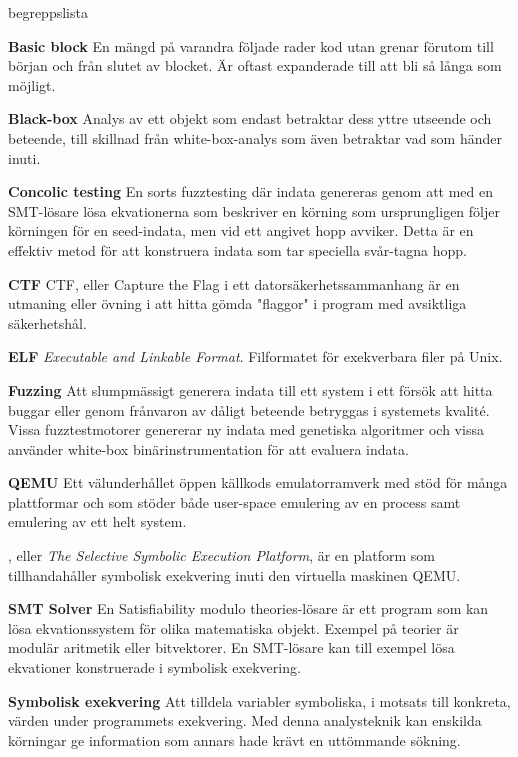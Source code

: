 \begin{labeling}{begreppslista}

  \item[\textbf{Basic block}] En mängd på varandra följade rader kod
      utan grenar förutom till början och från slutet av blocket. Är
      oftast expanderade till att bli så långa som möjligt.

  \item [\textbf{Black-box}] Analys av ett objekt som endast betraktar dess
      yttre utseende och beteende, till skillnad från white-box-analys som även
      betraktar vad som händer inuti.

  \item [\textbf{Concolic testing}] En sorts fuzztesting där indata genereras
      genom att med en SMT-lösare lösa ekvationerna som beskriver en körning som
      ursprungligen följer körningen för en seed-indata, men vid ett angivet
      hopp avviker. Detta är en effektiv metod för att konstruera indata som tar
      speciella svår-tagna hopp.

  \item [\textbf{CTF}] CTF, eller Capture the Flag i ett
    datorsäkerhetssammanhang är en utmaning eller övning i
    att hitta gömda "flaggor" i program med avsiktliga säkerhetshål.

  \item [\textbf{ELF}] \emph{Executable and Linkable Format}. Filformatet för
      exekverbara filer på Unix.

  \item [\textbf{Fuzzing}] Att slumpmässigt generera indata till ett system i
      ett försök att hitta buggar eller genom frånvaron av dåligt beteende
      betryggas i systemets kvalité. Vissa fuzztestmotorer genererar ny indata
      med genetiska algoritmer och vissa använder white-box binärinstrumentation
      för att evaluera indata.

  \item [\textbf{QEMU}] Ett välunderhållet öppen källkods emulatorramverk med stöd
    för många plattformar och som stöder både user-space emulering av en process
    samt emulering av ett helt system.

  \item [\textbf{\stoe}] \stoe, eller \emph{The Selective Symbolic Execution Platform}, är
      en platform som tillhandahåller symbolisk exekvering inuti den virtuella
      maskinen QEMU.

  \item [\textbf{SMT Solver}] En Satisfiability modulo theories-lösare är ett
      program som kan lösa ekvationssystem för olika matematiska objekt. Exempel
      på teorier är modulär aritmetik eller bitvektorer. En SMT-lösare kan till
      exempel lösa ekvationer konstruerade i symbolisk exekvering.

  \item [\textbf{Symbolisk exekvering}] Att tilldela variabler symboliska, i
      motsats till konkreta, värden under programmets exekvering. Med denna
      analysteknik kan enskilda körningar ge information som annars hade krävt
      en uttömmande sökning.

\end{labeling}
